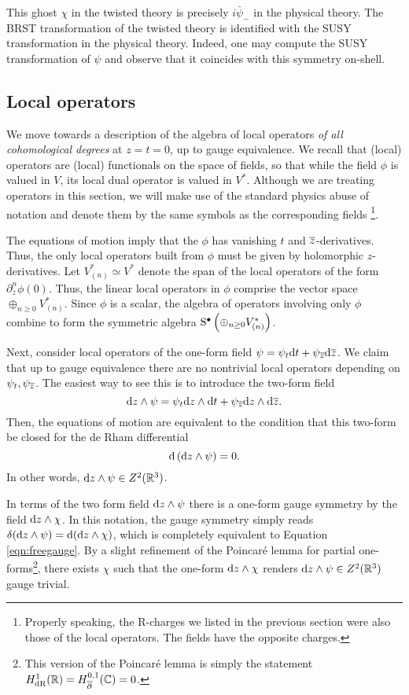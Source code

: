 \documentclass[11pt]{amsart}
\begin{document}
This ghost $\chi$ in the twisted theory is precisely $i \bar{\psi}_-$ in the physical theory. The BRST transformation of the twisted theory is identified with the SUSY transformation in the physical theory. Indeed, one may compute the SUSY transformation of $\psi$ and observe that it coincides with this symmetry on-shell. 

\subsection*{Local operators}

We move towards a description of the algebra of local operators \textit{of all cohomological degrees} at $z = t = 0$, up to gauge equivalence. We recall that (local) operators are (local) functionals on the space of fields, so that while the field $\phi$ is valued in $V$, its local dual operator is valued in $V^*$. Although we are treating operators in this section, we will make use of the standard physics abuse of notation and denote them by the same symbols as the corresponding fields \footnote{Properly speaking, the R-charges we listed in the previous section were also those of the local operators. The fields have the opposite charges.}. 

The equations of motion imply that the $\phi$ has vanishing $t$ and ${\overline{z}}$-derivatives. 
Thus, the only local operators built from $\phi$ must be given by holomorphic $z$-derivatives. 
Let $V^*_{(n)} \simeq V^*$ denote the span of the local operators of the form $\partial_z^n \phi(0)$.
Thus, the linear local operators in $\phi$ comprise the vector space $\oplus_{n \geq 0} V_{(n)}^*$.
Since $\phi$ is a scalar, the algebra of operators involving only $\phi$ combine to form the symmetric algebra ${\rm S}^\bullet \left(\oplus_{n \geq 0} V^*_{(n)}\right)$.

Next, consider local operators of the one-form field $\psi = \psi_t {\rm d} t + \psi_{\overline{z}} {\rm d} {\overline{z}}$. 
We claim that up to gauge equivalence there are no nontrivial local operators depending on $\psi_t, \psi_{\overline{z}}$.  
The easiest way to see this is to introduce the two-form field
\[
{\rm d} z \wedge \psi = \psi_t {\rm d} z \wedge {\rm d} t + \psi_{\overline{z}} {\rm d} z \wedge {\rm d} {\overline{z}} .
\]
Then, the equations of motion are equivalent to the condition that this two-form be closed for the de Rham differential
\[
{\rm d} \left({\rm d} z \wedge \psi\right) = 0 .
\]
In other words, ${\rm d} z \wedge \psi \in Z^2 (\mathbb R^3)$. 

In terms of the two form field ${\rm d} z \wedge \psi$ there is a one-form gauge symmetry by the field ${\rm d} z \wedge \chi$. 
In this notation, the gauge symmetry simply reads $\delta ({\rm d} z \wedge \psi) = {\rm d} ({\rm d} z \wedge \chi)$, which is completely equivalent to Equation \eqref{eqn:freegauge}.
By a slight refinement of the Poincar\'{e} lemma for partial one-forms\footnote{This version of the Poincar\'{e} lemma is simply the statement $H^1_{\rm dR} (\mathbb R) = H_{\overline{\partial}}^{0,1}(\mathbb C)= 0$.}, there exists $\chi$ such that the one-form ${\rm d} z \wedge \chi$ renders ${\rm d} z \wedge \psi \in Z^2(\mathbb R^3)$ gauge trivial. 
\end{document}
